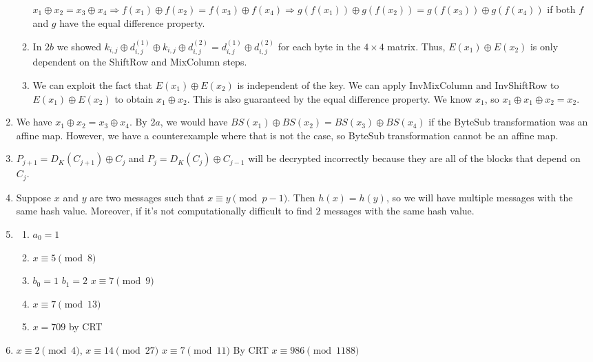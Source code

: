 \documentclass[10pt]{article}
\begin{document}
\begin{enumerate}[label= \arabic*.]
\begin{enumerate}
        $x_1\oplus x_2=x_3\oplus x_4\Rightarrow f(x_1)\oplus f(x_2)=f(x_3)\oplus f(x_4)\Rightarrow g(f(x_1))\oplus g(f(x_2))=g(f(x_3))\oplus g(f(x_4))$ if both $f$ and $g$ have the equal difference property.
        \item In $2b$ we showed $k_{i,j}\oplus d_{i,j}^{(1)}\oplus k_{i,j}\oplus d_{i,j}^{(2)}=d_{i,j}^{(1)}\oplus d_{i,j}^{(2)}$ for each byte in the $4\times 4$ matrix.  
        Thus, $E(x_1)\oplus E(x_2)$ is only dependent on the ShiftRow and MixColumn steps.
        \item We can exploit the fact that $E(x_1)\oplus E(x_2)$ is independent of the key. We can apply InvMixColumn and InvShiftRow to $E(x_1)\oplus E(x_2)$ to obtain $x_1\oplus x_2$. This is also guaranteed by the equal difference property. We know $x_1$, so $x_1\oplus x_1\oplus x_2=x_2$.
    \end{enumerate}
    \item We have $x_1\oplus x_2=x_3\oplus x_4$. By $2a$, we would have $BS(x_1)\oplus BS(x_2)=BS(x_3)\oplus BS(x_4)$ if the ByteSub transformation was an affine map. However, we have a counterexample where that is not the case, so ByteSub transformation cannot be an affine map.
    \item $P_{j+1}=D_K(C_{j+1})\oplus C_{j}$ and $P_j=D_K(C_{j})\oplus C_{j-1}$ will be decrypted incorrectly because they are all of the blocks that depend on $C_j$.
    \item Suppose $x$ and $y$ are two messages such that $x\equiv y\pmod{p-1}$. Then $h(x)=h(y)$, so we will have multiple messages with the same hash value. Moreover, if it's not computationally difficult to find $2$ messages with the same hash value. 
    \item \begin{enumerate}
        \item $a_0=1$
        \item $x\equiv 5\pmod{8}$
        \item $b_0=1$ $b_1=2$ $x\equiv 7\pmod{9}$
        \item $x\equiv 7\pmod{13}$
        \item $x=709$ by CRT
    \end{enumerate}
    \item $x\equiv 2\pmod{4}$, $x\equiv 14\pmod{27}$ $x\equiv 7\pmod{11}$ By CRT $x\equiv 986\pmod{1188}$
\end{enumerate}

\end{document}
